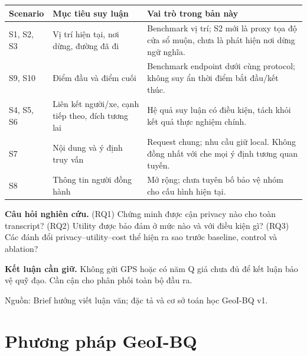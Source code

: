 \documentclass[10pt,a4paper]{article}
\newcommand{\source}[1]{\par{\footnotesize\color{gray}Nguồn: #1}\par}
\newcommand{\claim}[1]{\par\textbf{Kết luận cần giữ.} #1\par}
\begin{document}
\begin{tabularx}{\linewidth}{@{}P{2.4cm}P{4.2cm}Y@{}}\toprule
\textbf{Scenario} & \textbf{Mục tiêu suy luận} & \textbf{Vai trò trong bản này}\\\midrule
S1, S2, S3 & Vị trí hiện tại, nơi dừng, đường đã đi & Benchmark vị trí; S2 mới là proxy tọa độ cửa sổ muộn, chưa là phát hiện nơi dừng ngữ nghĩa.\\
S9, S10 & Điểm đầu và điểm cuối & Benchmark endpoint dưới cùng protocol; không suy ẩn thời điểm bắt đầu/kết thúc.\\
S4, S5, S6 & Liên kết người/xe, cạnh tiếp theo, đích tương lai & Hệ quả suy luận có điều kiện, tách khỏi kết quả thực nghiệm chính.\\
S7 & Nội dung và ý định truy vấn & Request chung; nhu cầu giữ local. Không đồng nhất với che mọi ý định tương quan tuyến.\\
S8 & Thông tin người đồng hành & Mở rộng; chưa tuyên bố bảo vệ nhóm cho cấu hình hiện tại.\\\bottomrule
\end{tabularx}

\textbf{Câu hỏi nghiên cứu.} (RQ1) Chứng minh được cận privacy nào cho toàn transcript?
(RQ2) Utility được bảo đảm ở mức nào và với điều kiện gì? (RQ3) Các đánh đổi privacy--utility--cost
thể hiện ra sao trước baseline, control và ablation?
\claim{Không gửi GPS hoặc có năm Q giả chưa đủ để kết luận bảo vệ quỹ đạo. Cần cận cho phân phối toàn bộ đầu ra.}
\source{Brief hướng viết luận văn; đặc tả và cơ sở toán học GeoI-BQ v1.}

\clearpage
\section{Phương pháp GeoI-BQ}
\end{document}
